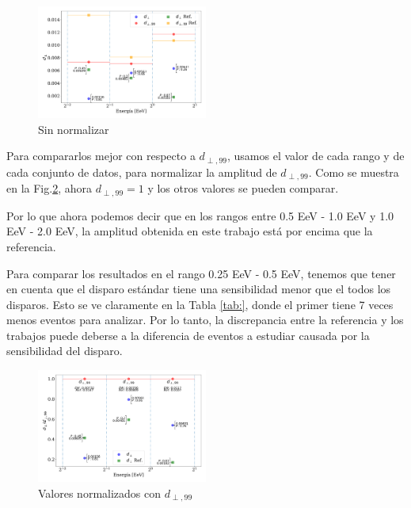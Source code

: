     \begin{figure}[H]
        \begin{small}
            \begin{center}
                \includegraphics[width=0.5\textwidth]{d_perp_no_normalizado_v2.pdf}
            \end{center}
            \caption{Sin normalizar}
            \label{fig:no_normalizado}
        \end{small}
    \end{figure}
    
    Para compararlos mejor con respecto a $d_{\perp,99}$, usamos el valor de cada rango y de cada conjunto de datos, para normalizar la amplitud de $d_{\perp,99}$. Como se muestra en la Fig.\ref{fig:normalizado}, ahora $d_{\perp,99}=1$ y los otros valores se pueden comparar. 


Por lo que ahora podemos decir que en los rangos entre 0.5 EeV - 1.0 EeV y 1.0 EeV - 2.0 EeV, la amplitud obtenida en este trabajo está por encima que la referencia. 

Para comparar los resultados en el  rango 0.25 EeV - 0.5 EeV, tenemos que tener en cuenta que el disparo estándar tiene una sensibilidad menor que el todos los disparos. Esto se ve claramente en la Tabla \ref{tab:}, donde el primer tiene 7 veces menos eventos para analizar. Por lo tanto, la discrepancia entre la referencia y los trabajos puede deberse a la  diferencia de eventos a estudiar causada por la sensibilidad del disparo.


\begin{figure}[H]
    \begin{small}
        \begin{center}
            \includegraphics[width=0.5\textwidth]{d_perp_normalizado.pdf}
        \end{center}
        \caption{Valores normalizados con $d_{\perp,99}$}
        \label{fig:normalizado}
    \end{small}
\end{figure}

    
    
    
    
